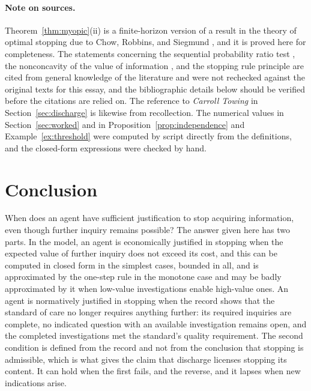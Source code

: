\documentclass[11pt]{article}
\theoremstyle{plain}
\theoremstyle{definition}
\begin{document}
\paragraph{Note on sources.} Theorem~\ref{thm:myopic}(ii) is a finite-horizon version of a result in the theory of optimal stopping due to Chow, Robbins, and Siegmund \cite{chow1971great}, and it is proved here for completeness. The statements concerning the sequential probability ratio test \cite{wald1948optimum,arrow1949bayes}, the nonconcavity of the value of information \cite{radner1984nonconcavity}, and the stopping rule principle \cite{berger1988likelihood} are cited from general knowledge of the literature and were not rechecked against the original texts for this essay, and the bibliographic details below should be verified before the citations are relied on. The reference to \emph{Carroll Towing} in Section~\ref{sec:discharge} is likewise from recollection. The numerical values in Section~\ref{sec:worked} and in Proposition~\ref{prop:independence} and Example~\ref{ex:threshold} were computed by script directly from the definitions, and the closed-form expressions were checked by hand.

\section{Conclusion}\label{sec:conclusion}

When does an agent have sufficient justification to stop acquiring information, even though further inquiry remains possible? The answer given here has two parts. In the model, an agent is economically justified in stopping when the expected value of further inquiry does not exceed its cost, and this can be computed in closed form in the simplest cases, bounded in all, and is approximated by the one-step rule in the monotone case and may be badly approximated by it when low-value investigations enable high-value ones. An agent is normatively justified in stopping when the record shows that the standard of care no longer requires anything further: its required inquiries are complete, no indicated question with an available investigation remains open, and the completed investigations met the standard's quality requirement. The second condition is defined from the record and not from the conclusion that stopping is admissible, which is what gives the claim that discharge licenses stopping its content. It can hold when the first fails, and the reverse, and it lapses when new indications arise.
\end{document}
